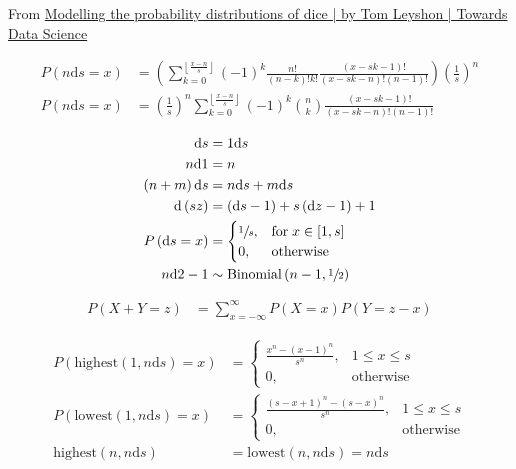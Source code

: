 \documentclass{article}
\newcommand\p[1]{\left( #1 \right)}
\renewcommand{\d}{\text{d}}
\begin{document}
From \href{https://towardsdatascience.com/modelling-the-probability-distributions-of-dice-b6ecf87b24ea}
{Modelling the probability distributions of dice | by Tom Leyshon | Towards Data Science}

\begin{align}
    P(n\d s=x) & =\p{\sum_{k=0}^{\left\lfloor \frac{x-n}{s}\right\rfloor}\p{-1}^k\frac{n!}{\p{n-k}!k!}\frac{\p{x-sk-1}!}{\p{x-sk-n}!\p{n-1}!}}\p{\frac{1}{s}}^n \\
    P(n\d s=x) & =\p{\frac{1}{s}}^n\sum_{k=0}^{\left\lfloor \frac{x-n}{s}\right\rfloor}\p{-1}^k{n \choose k}\frac{\p{x-sk-1}!}{\p{x-sk-n}!\p{n-1}!}
\end{align}

\begin{align}
    \d s        & = 1\d s                                                  \\
    n\d 1       & = n                                                      \\
    \p{n+m}\d s & = n\d s + m\d s                                          \\
    \d \p{sz}   & = \p{\d s - 1} + s\p{\d z - 1} + 1                       \\
    P\p{\d s=x} & = \begin{cases}
                        \sfrac{1}{s}, & \text{for}\; x \in \left[ 1, s \right] \\
                        0,            & \text{otherwise}
                    \end{cases} \\
    n\d 2 - 1   & \sim \text{Binomial}\p{n-1, \sfrac{1}{2}}
\end{align}

\begin{align}
    P(X+Y=z) & =\sum_{x=-\infty }^{\infty }P(X=x)P(Y=z-x)
\end{align}

\begin{align}
    P\p{\text{highest}\p{1, n\d s}=x} & = \begin{cases}
                                              \frac{x^n-\p{x-1}^n}{s^n}, & 1\leq x\leq s    \\
                                              0,                         & \text{otherwise}
                                          \end{cases}                      \\
    P\p{\text{lowest}\p{1, n\d s}=x}  & = \begin{cases}
                                              \frac{\p{s-x+1}^n-\p{s-x}^n}{s^n}, & 1\leq x\leq s    \\
                                              0,                                 & \text{otherwise}
                                          \end{cases} \\
    \text{highest}\p{n, n\d s}        & = \text{lowest}\p{n, n\d s} = n\d s
\end{align}
\end{document}
